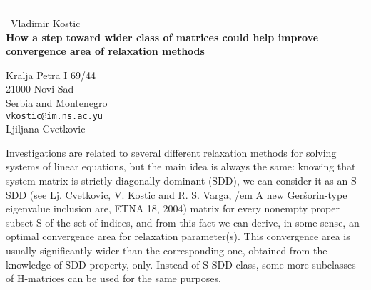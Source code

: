 \documentclass{report}
\begin{document}
\begin{center}
\rule{6in}{1pt} \
{\large Vladimir Kostic \\
{\bf How a step toward wider class of matrices could help improve convergence area of relaxation methods}}

Kralja Petra I 69/44 \\ 21000 Novi Sad \\ Serbia and Montenegro
\\
{\tt vkostic@im.ns.ac.yu}\\
Ljiljana Cvetkovic\end{center}

Investigations are related to several different relaxation methods for
solving systems of linear equations, but the main idea is always the
same: knowing that system matrix is strictly diagonally dominant (SDD),
we can consider it as an S-SDD (see Lj. Cvetkovic, V. Kostic and R. S.
Varga, {/em A new Ger\v sorin-type eigenvalue inclusion are}, ETNA 18,
2004) matrix for every nonempty proper subset S of the set of indices,
and from this fact we can derive, in some sense, an optimal convergence
area for relaxation parameter(s). This convergence area is usually
significantly wider than the corresponding one, obtained from the
knowledge of SDD property, only. Instead of S-SDD class, some more
subclasses of H-matrices can be used for the same purposes.
\end{document}
